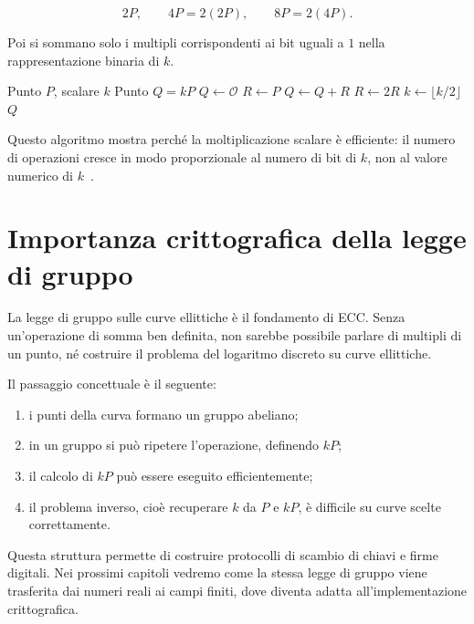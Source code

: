 \documentclass[12pt,a4paper,oneside]{report}
\begin{document}
\[
2P,\qquad 4P=2(2P),\qquad 8P=2(4P).
\]

Poi si sommano solo i multipli corrispondenti ai bit uguali a \(1\) nella rappresentazione binaria di \(k\).

\begin{algorithm}[h]
\caption{Moltiplicazione scalare double-and-add}
\begin{algorithmic}[1]
\REQUIRE Punto \(P\), scalare \(k\)
\ENSURE Punto \(Q=kP\)
\STATE \(Q \leftarrow \mathcal{O}\)
\STATE \(R \leftarrow P\)
        \STATE \(Q \leftarrow Q+R\)
    \ENDIF
    \STATE \(R \leftarrow 2R\)
    \STATE \(k \leftarrow \lfloor k/2 \rfloor\)
\ENDWHILE
\RETURN \(Q\)
\end{algorithmic}
\end{algorithm}

Questo algoritmo mostra perché la moltiplicazione scalare è efficiente: il numero di operazioni cresce in modo proporzionale al numero di bit di \(k\), non al valore numerico di \(k\)~\cite{sec1}.

\section{Importanza crittografica della legge di gruppo}

La legge di gruppo sulle curve ellittiche è il fondamento di ECC. Senza un'operazione di somma ben definita, non sarebbe possibile parlare di multipli di un punto, né costruire il problema del logaritmo discreto su curve ellittiche.

Il passaggio concettuale è il seguente:

\begin{enumerate}
    \item i punti della curva formano un gruppo abeliano;
    \item in un gruppo si può ripetere l'operazione, definendo \(kP\);
    \item il calcolo di \(kP\) può essere eseguito efficientemente;
    \item il problema inverso, cioè recuperare \(k\) da \(P\) e \(kP\), è difficile su curve scelte correttamente.
\end{enumerate}

Questa struttura permette di costruire protocolli di scambio di chiavi e firme digitali. Nei prossimi capitoli vedremo come la stessa legge di gruppo viene trasferita dai numeri reali ai campi finiti, dove diventa adatta all'implementazione crittografica.
\end{document}
